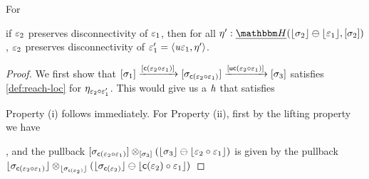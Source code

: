 \begin{lemma}\label{lem:dcon-pres-data-agn}
    For 
    if $\varepsilon_2$ preserves disconnectivity of $\varepsilon_1$, then for all $\mvarM' : \dheapF(\concL{\sigma_2} \ominus \concL{\me_1}, \anyL{\sigma_2})$,  $\varepsilon_2$ preserves disconnectivity of $\varepsilon_1' = \langle\mathit{u}\varepsilon_1, \eta'\rangle$.
\end{lemma}
\begin{proof}
    We first show that $[\sigma_1] \xrightarrow{[\mathsf{c}(\varepsilon_2 \circ \varepsilon_1)]} [\sigma_{\mathsf{c}(\varepsilon_2 \circ \varepsilon_1)}] \xrightarrow{[\mathsf{uc}(\varepsilon_2 \circ \varepsilon_1)]} [\sigma_3]$
    satisfies \cref{def:reach-loc} for $\eta_{\varepsilon_2 \circ \varepsilon_1'}$.
    This would give us a $\mathit{h}$ that satisfies
    \begin{center}
    \end{center}
    Property (i) follows immediately.
    For Property (ii), first by the lifting property we have
    ,
    and the pullback $[\sigma_{\mathsf{c}(\varepsilon_2 \circ \varepsilon_1)}] \otimes_{[\sigma_3]} (\lfloor\sigma_3\rfloor \ominus \lfloor\varepsilon_2 \circ \varepsilon_1\rfloor)$
    is given by the pullback
    ${\lfloor\sigma_{\mathsf{c}(\varepsilon_2 \circ \varepsilon_1)}\rfloor \otimes_{\lfloor\sigma_{\mathsf{c}(\varepsilon_2)}\rfloor} (\lfloor\sigma_{\mathsf{c}(\varepsilon_2)}\rfloor \ominus \lfloor\mathsf{c}(\varepsilon_2) \circ \varepsilon_1\rfloor)}$

\end{proof}
